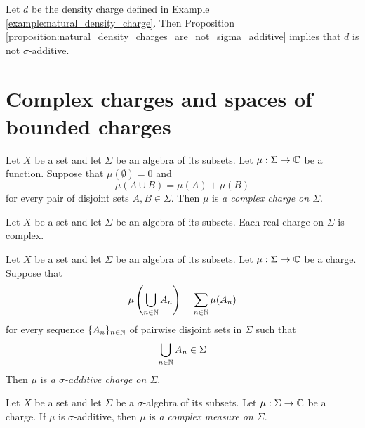 \begin{remark}\label{remark:natural_density_is_not_sigma_additive}
    Let $d$ be the density charge defined in Example \ref{example:natural_density_charge}. Then Proposition \ref{proposition:natural_density_charges_are_not_sigma_additive} implies that $d$ is not $\sigma$-additive.
\end{remark}

\section{Complex charges and spaces of bounded charges}

\begin{definition}
    Let $X$ be a set and let $\Sigma$ be an algebra of its subsets. Let $\mu:\Sigma \rightarrow {\mathbb C}$ be a function. Suppose that $\mu(\emptyset) = 0$ and
    $$\mu(A \cup B) = \mu(A) + \mu(B)$$
    for every pair of disjoint sets $A,B \in \Sigma$. Then $\mu$ is \textit{a complex charge on $\Sigma$}.
\end{definition}

\begin{remark}\label{remark:each_real_charge_is_complex}
    Let $X$ be a set and let $\Sigma$ be an algebra of its subsets. Each real charge on $\Sigma$ is complex.
\end{remark}

\begin{definition}
    Let $X$ be a set and let $\Sigma$ be an algebra of its subsets. Let $\mu:\Sigma \rightarrow {\mathbb C}$ be a charge. Suppose that
    $$\mu\left(\bigcup_{n\in {\mathbb N}}A_n\right) = \sum_{n \in {\mathbb N}}\mu(A_n)$$
    for every sequence $\{A_n\}_{n\in {\mathbb N}}$ of pairwise disjoint sets in $\Sigma$ such that
    $$\bigcup_{n\in {\mathbb N}}A_n \in \Sigma$$
    Then $\mu$ is \textit{a $\sigma$-additive charge on $\Sigma$}.
\end{definition}

\begin{definition}
    Let $X$ be a set and let $\Sigma$ be a $\sigma$-algebra of its subsets. Let $\mu:\Sigma \rightarrow {\mathbb C}$ be a charge. If $\mu$ is $\sigma$-additive, then $\mu$ is \textit{a complex measure on $\Sigma$}.
\end{definition}

